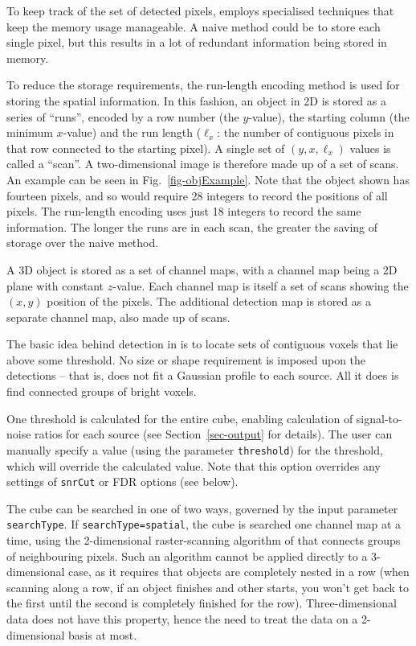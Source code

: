 To keep track of the set of detected pixels, \duchamp
employs specialised techniques that keep the memory usage
manageable. A naive method could be to store each single pixel, but
this results in a lot of redundant information being stored in memory.

To reduce the storage requirements, the run-length encoding method is
used for storing the spatial information. In this fashion, an object
in 2D is stored as a series of ``runs'', encoded by a row number (the
$y$-value), the starting column (the minimum $x$-value) and the run
length ($\ell_x$: the number of contiguous pixels in that row
connected to the starting pixel). A single set of $(y,x,\ell_x)$
values is called a ``scan''. A two-dimensional image is therefore made
up of a set of scans. An example can be seen in
Fig.~\ref{fig-objExample}. Note that the object shown has fourteen
pixels, and so would require 28 integers to record the positions of
all pixels. The run-length encoding uses just 18 integers to record
the same information. The longer the runs are in each scan, the
greater the saving of storage over the naive method.

A 3D object is stored as a set of channel maps, with a channel map
being a 2D plane with constant $z$-value. Each channel map is itself a
set of scans showing the $(x,y)$ position of the pixels. The
additional detection map is stored as a separate channel map, also
made up of scans.


The basic idea behind detection in \duchamp is to locate sets of
contiguous voxels that lie above some threshold. No size or shape
requirement is imposed upon the detections -- that is, \duchamp does
not fit \eg a Gaussian profile to each source. All it does is find
connected groups of bright voxels.

One threshold is calculated for the entire cube, enabling calculation
of signal-to-noise ratios for each source (see
Section~\ref{sec-output} for details). The user can manually specify a
value (using the parameter \texttt{threshold}) for the threshold,
which will override the calculated value. Note that this option
overrides any settings of \texttt{snrCut} or FDR options (see below). 

The cube can be searched in one of two ways, governed by the input
parameter \texttt{searchType}. If \texttt{searchType=spatial}, the
cube is searched one channel map at a time, using the 2-dimensional
raster-scanning algorithm of \citet{lutz80} that connects groups of
neighbouring pixels. Such an algorithm cannot be applied directly to a
3-dimensional case, as it requires that objects are completely nested
in a row (when scanning along a row, if an object finishes and other
starts, you won't get back to the first until the second is completely
finished for the row). Three-dimensional data does not have this
property, hence the need to treat the data on a 2-dimensional basis at
most.

